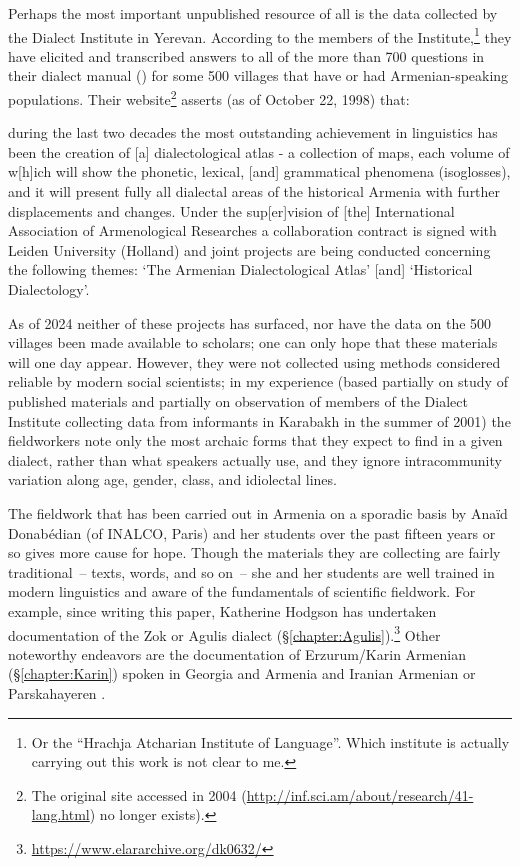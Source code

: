 \documentclass[output=paper]{langscibook}
\begin{document}
Perhaps the most important unpublished resource of all is the data collected by the Dialect Institute in Yerevan. According to the members of the Institute,\footnote{Or the ``Hrachja Atcharian Institute of Language''.  Which institute is actually carrying out this work is not clear to me.} they  have elicited and transcribed answers to all of the more than 700 questions in their dialect manual (\citealt{MuradyanEtAl-1977-DialectologyBook})  for some 500 villages that have or had Armenian\hyp speaking populations. Their website\footnote{The original site accessed in 2004 (\url{http://inf.sci.am/about/research/41-lang.html}) no longer exists).}  asserts (as of October 22, 1998) that:

\begin{modquote}
during the last two decades the most outstanding achievement in linguistics has been the creation of [a] dialectological atlas - a collection of maps, each volume of w[h]ich will show the phonetic, lexical, [and] grammatical phenomena (isoglosses), and it will present fully all dialectal areas of the historical Armenia with further displacements and changes. Under the sup[er]vision of [the] International Association of Armenological Researches a collaboration contract is signed with Leiden University (Holland) and joint projects are being conducted concerning the following themes: `The Armenian Dialectological Atlas' [and] `Historical Dialectology'.
\end{modquote}

As of 2024 neither of these projects has surfaced, nor have the data on the 500 villages been made available to scholars; one can only hope that these materials will one day appear. However, they were not collected using methods considered reliable by modern social scientists; in my experience (based partially on study of published materials and partially on observation of members of the Dialect Institute collecting data from informants in Karabakh in the summer of 2001) the fieldworkers note only the most archaic forms that they expect to find in a given dialect, rather than what speakers actually use, and they ignore intracommunity variation along age, gender, class, and idiolectal lines.

The fieldwork that has been carried out in Armenia on a sporadic basis by Anaïd Donabédian (of INALCO, Paris) and her students over the past fifteen years or so gives more cause for hope. Though the materials they are collecting are fairly traditional~– texts, words, and so on~– she and her students are well trained in modern linguistics and aware of the fundamentals of scientific fieldwork. For example, since writing this paper, Katherine Hodgson has undertaken documentation of the Zok or Agulis dialect (\S\ref{chapter:Agulis}).\footnote{\url{https://www.elararchive.org/dk0632/}} Other noteworthy endeavors are the documentation of Erzurum/Karin Armenian (\S\ref{chapter:Karin}) spoken in Georgia and Armenia \citep{Bezrukov-2022-DissCaucasusMotionArmenian} and Iranian Armenian or Parskahayeren \citep{DolatianEtAl-prep-IranianGrammar}. 
\end{document}
